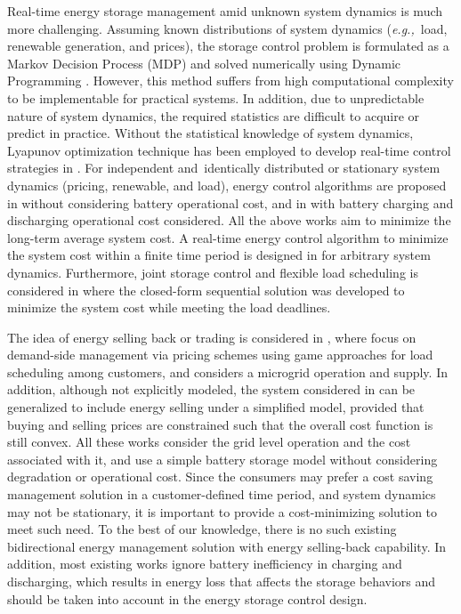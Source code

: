 \documentclass[journal]{IEEEtran}
\def\eg{{\it e.g.,\ \/}}
\begin{document}
Real-time energy storage management amid unknown system dynamics is much more challenging. Assuming known distributions of system dynamics (\eg load, renewable generation, and prices), the storage control problem is formulated as a Markov Decision Process (MDP) and solved numerically using Dynamic Programming \cite{Zhang&Schaar:JTSP14,RahbarXu:TSG15}. However, this method suffers from high computational complexity to be implementable for practical systems.  In addition, due to unpredictable nature of system dynamics, the required statistics are difficult to acquire or predict in practice. Without the statistical knowledge of system dynamics, Lyapunov optimization technique \cite{book:Neely} has been employed to develop real-time control strategies in
\cite{Li&Dong:JSAC15,Li&Dong:TSG16,Huang&Walrand&Ramchandran:SmatGridComm12,Sergio&Ming&Pan&Yong_TSG13,Li&Dong:ICASSP2013,Li&Dong:acssc2013}. For independent and\ identically distributed  or stationary system dynamics (pricing, renewable, and load), energy control algorithms are proposed in \cite{Huang&Walrand&Ramchandran:SmatGridComm12,Sergio&Ming&Pan&Yong_TSG13} without considering battery operational cost, and in  \cite{Li&Dong:ICASSP2013}  with battery charging and discharging operational cost considered. All the above works  aim to minimize the long-term average system cost. A real-time energy control algorithm to minimize the system cost within a finite time period is designed in \cite{Li&Dong:JSAC15} for arbitrary system dynamics. Furthermore, joint storage control and flexible load scheduling is considered in \cite{Li&Dong:TSG16} where the closed-form sequential solution was developed  to minimize the system cost while meeting the load deadlines.

The idea of  energy selling back or trading  is considered in \cite{Kimetal:JSAC13,Mediwaththe&etal:TSG17,Huang&Mao&Nelms:J_SmartGrid2014}, where    \cite{Kimetal:JSAC13,Mediwaththe&etal:TSG17} focus on demand-side management via pricing schemes using game approaches for load scheduling among customers, and \cite{Huang&Mao&Nelms:J_SmartGrid2014} considers a microgrid operation and supply. In addition, although not explicitly modeled, the system considered in \cite{Qinetal:TSG16} can be generalized to include energy selling under a simplified model, provided that  buying and selling prices are constrained such that the overall cost function is still convex. All these works consider the grid level operation  and the cost associated with it, and use a simple battery storage model without  considering degradation or operational cost. Since the consumers may prefer a cost saving management solution in a customer-defined time period, and system dynamics may not be stationary, it is important to provide a cost-minimizing  solution to meet such need.  To the best of our knowledge, there is no such existing   bidirectional energy  management solution with energy selling-back capability. In addition, most existing works ignore battery inefficiency in charging and discharging, which results in energy loss that affects the storage behaviors and should be taken into account in the energy storage control design.
\end{document}
